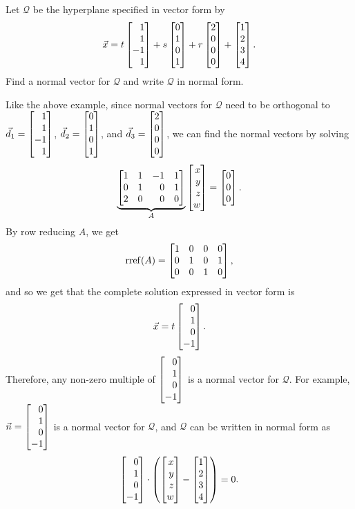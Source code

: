 \begin{example}
	Let $\mathcal Q$ be the hyperplane specified in vector form by
	\[
		\vec x=t\mat{1\\1\\-1\\1}+s\mat{0\\1\\0\\1}+r\mat{2\\0\\0\\0}+\mat{1\\2\\3\\4}.
	\]
	Find a normal vector for $\mathcal Q$ and write $\mathcal Q$ in normal form.

	Like the above example, since normal vectors for $\mathcal Q$ need to be orthogonal to $\vec d_1=\mat{1\\1\\-1\\1}$, $\vec d_2=\mat{0\\1\\0\\1}$, and $\vec d_3=\mat{2\\0\\0\\0}$, we can find the normal vectors by solving
	\[
	\underbrace{\mat{1&1&-1&1\\0&1&0&1\\2&0&0&0}}_A\mat{x\\y\\z\\w}=\mat{0\\0\\0}.
    \]
    By row reducing $A$, we get
    \[
        \Rref(A) = \mat{1&0&0&0\\0&1&0&1\\0&0&1&0},
    \]
    and so we get that the complete solution expressed in vector form is
    \[
        \vec x = t\mat{0\\1\\0\\-1}.
	\]
    Therefore, any non-zero multiple of $\mat{0\\1\\0\\-1}$ is a normal vector for $\mathcal Q$. For example, $\vec n =\mat{0\\1\\0\\-1}$ is a normal vector for $\mathcal Q$, and $\mathcal Q$ can be written in normal form as 
    \[
	    \mat{0\\1\\0\\-1}\cdot\left(\mat{x\\y\\z\\w}-\mat{1\\2\\3\\4}\right)=0.
    \]
\end{example}




